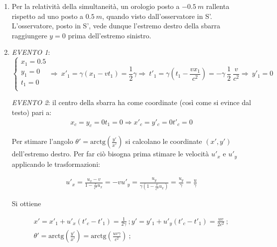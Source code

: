 \documentclass[12pt,twoside,a4]{article}
\begin{document}
\newpage
\begin{solution}
\begin{enumerate}[label=(\textit{\roman*})]
\item Per la relatività della simultaneità, un orologio posto a $-0.5 \ m$ rallenta rispetto ad uno posto a $0.5 \ m$, quando visto dall'osservatore in S'. L'osservatore, posto in S', vede dunque l'estremo destro della sbarra raggiungere $y=0$ prima dell'estremo sinistro.

\item \emph{EVENTO 1}:
\begin{equation*}
    \begin{cases}
        x_1 = 0.5 \\
        y_1 = 0 \\
        t_1 = 0 \\
    \end{cases} 
    \Rightarrow \ x'_1 = \gamma(x_1 - v t_1) = \frac{1}{2} \gamma  \Rightarrow \ t'_1 = \gamma \left(t_1 - \frac{v x_1}{c^2} \right) = -\gamma \ \frac{1}{2} \ \frac{v}{c^2}   \Rightarrow \  y'_1 = 0
\end{equation*}

\emph{EVENTO 2}: il centro della sbarra ha come coordinate (così come si evince dal testo) pari a: 
\begin{gather*}
x_c = y_c = 0 
t_1 = 0 
\Rightarrow  x'_c = y'_c = 0 
t'_c = 0
\end{gather*}

Per stimare l'angolo $\theta' = \mathrm{arctg}\left(\frac{y'}{x'} \right)$ si calcolano le coordinate $(x',y')$ dell'estremo destro. Per far ciò bisogna prima stimare le velocità $u'_x$ e $u'_y$ applicando le trasformazioni:

\begin{gather*}
u'_x = \frac{u_x - v}{1-\frac{v}{c^2} u_x} = -v   
u'_y = \frac{u_y}{\gamma \left(1-\frac{v}{c^2} u_x\right)} = \frac{u_y}{\gamma} = \frac{u}{\gamma}
\end{gather*}

Si ottiene

\begin{gather*}
x' = x'_1 + u'_x(t'_c - t'_1) = \frac{1}{2\gamma} \ ;  
y' = y'_1 + u'_y(t'_c-t'_1) = \frac{u v}{2 c^2} \ ; \\
\theta' = \mathrm{arctg}\left(\frac{y'}{x'} \right) = \mathrm{arctg}\left(\frac{u v \gamma}{c^2} \right) \ ; 
\end{gather*}
\end{enumerate}
\end{solution}
\end{document}

